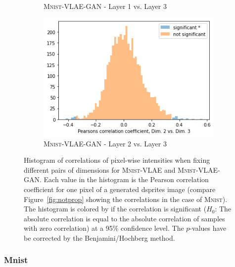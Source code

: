 \begin{figure}
\begin{subfigure}{.3\textwidth}
        \caption{\textsc{Mnist}-\ac{VLAE}-\ac{GAN} - Layer 1 vs. Layer 3}
    \end{subfigure}
    \hfill
    \begin{subfigure}{.3\textwidth}
        \includegraphics[width=\textwidth]{images/notprop/dsprites/vlae_gan/dim_2_3.png}
        \caption{\textsc{Mnist}-\ac{VLAE}-\ac{GAN} - Layer 2 vs. Layer 3}
    \end{subfigure}
    \caption[\textsc{Mnist}-\ac{VLAE} and \textsc{Mnist}-\ac{VLAE}-\ac{GAN} - Pixel intensity correlation]{Histogram of correlations of pixel-wise intensities when fixing different pairs of dimensions for \textsc{Mnist}-\ac{VLAE} and \textsc{Mnist}-\ac{VLAE}-\ac{GAN}.
    Each value in the histogram is the Pearson correlation coefficient for one pixel of a generated dsprites image (compare Figure~\ref{fig:notprop} showing the correlations in the case of \textsc{Mnist}).
    The histogram is colored by if the correlation is significant ($H_0$: The absolute correlation is equal to the absolute correlation of samples with zero correlation) at a 95\% confidence level.
    The $p$-values have be corrected by the Benjamini/Hochberg method.}
    \label{fig:mnist_vlae_notprop}
\end{figure}

\subsubsection{Mnist}

